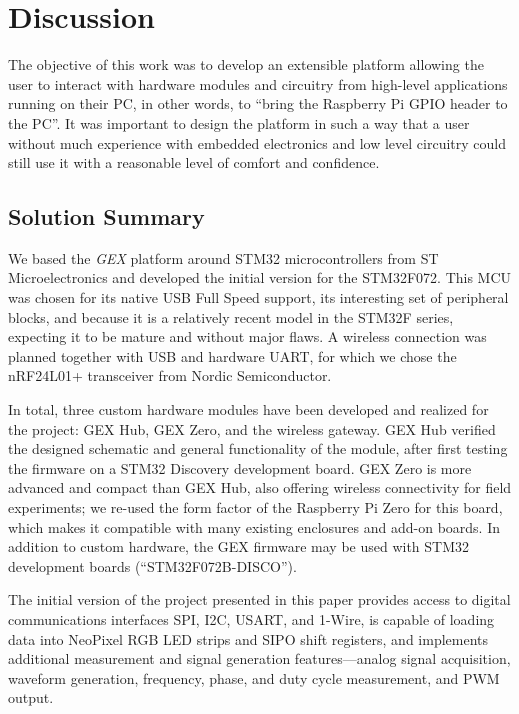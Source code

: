 \chapter{Discussion}

The objective of this work was to develop an extensible platform allowing the user to interact with hardware modules and circuitry from high-level applications running on their \gls{PC}, in other words, to ``bring the Raspberry Pi \gls{GPIO} header to the \gls{PC}''. It was important to design the platform in such a way that a user without much experience with embedded electronics and low level circuitry could still use it with a reasonable level of comfort and confidence.

\section{Solution Summary}

We based the \textit{GEX} platform around STM32 microcontrollers from ST Microelectronics and developed the initial version for the STM32F072. This \gls{MCU} was chosen for its native \gls{USB} Full Speed support, its interesting set of peripheral blocks, and because it is a relatively recent model in the STM32F series, expecting it to be mature and without major flaws. A wireless connection was planned together with \gls{USB} and hardware \gls{UART}, for which we chose the nRF24L01+ transceiver from Nordic Semiconductor.

In total, three custom hardware modules have been developed and realized for the project: GEX Hub, GEX Zero, and the wireless gateway. GEX Hub verified the designed schematic and general functionality of the module, after first testing the firmware on a STM32 Discovery development board. GEX Zero is more advanced and compact than GEX Hub, also offering wireless connectivity for field experiments; we re-used the form factor of the Raspberry Pi Zero for this board, which makes it compatible with many existing enclosures and add-on boards. In addition to custom hardware, the GEX firmware may be used with STM32 development boards (``STM32F072B-DISCO'').

The initial version of the project presented in this paper provides access to digital communications interfaces \gls{SPI}, \gls{I2C}, \gls{USART}, and 1-Wire, is capable of loading data into NeoPixel RGB \gls{LED} strips and \gls{SIPO} shift registers, and implements additional measurement and signal generation features---analog signal acquisition, waveform generation, frequency, phase, and duty cycle measurement, and \gls{PWM} output.

